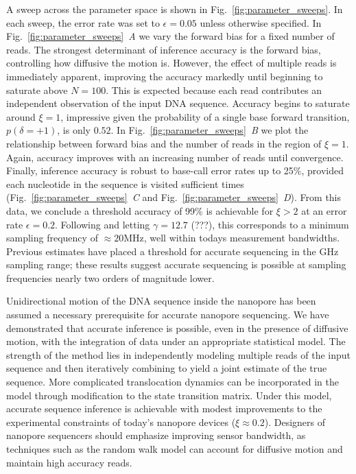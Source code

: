 \documentclass{biophys_letter}
\newcommand{\mhz}{\si{\mega\hertz}}
\newcommand{\kje}[1]{\textcolor{BurntOrange}{#1}}
\begin{document}
A sweep across the parameter space is shown in Fig.~\ref{fig:parameter_sweeps}.
In each sweep, the error rate was set to $\epsilon=0.05$ unless otherwise specified.
In Fig.~\ref{fig:parameter_sweeps}\emph{~A} we vary the forward bias for a fixed number of reads.
The strongest determinant of inference accuracy is the forward bias, controlling how diffusive the motion is.
However, the effect of multiple reads is immediately apparent, improving the accuracy markedly until beginning to saturate above $N=100$.
This is expected because each read contributes an independent observation of the input DNA sequence.
Accuracy begins to saturate around $\xi=1$, impressive given the probability of a single base forward transition, $p(\delta=+1)$, is only $0.52$.
In Fig.~\ref{fig:parameter_sweeps}\emph{~B} we plot the relationship between forward bias and the number of reads in the region of $\xi=1$.
Again, accuracy improves with an increasing number of reads until convergence.
Finally, inference accuracy is \kje{robust to base-call error rates up to 25\%}, provided each nucleotide in the sequence is visited sufficient times (Fig.~\ref{fig:parameter_sweeps}\emph{~C} and Fig.~\ref{fig:parameter_sweeps}\emph{~D}).
\kje{From this data, we conclude a threshold accuracy of 99\% is achievable for $\xi>2$ at an error rate $\epsilon=0.2$.
Following \cite{Larkin:2013} and letting $\gamma=12.7$ (???), this corresponds to a minimum sampling frequency of $\approx20\mhz$, well within todays measurement bandwidths.
Previous estimates have placed a threshold for accurate sequencing in the GHz sampling range; these results suggest accurate sequencing is possible at sampling frequencies nearly two orders of magnitude lower.}

Unidirectional motion of the DNA sequence inside the nanopore has been assumed a necessary prerequisite for accurate nanopore sequencing.
We have demonstrated that accurate inference is possible, even in the presence of diffusive motion, with the integration of data under an appropriate statistical model.
The strength of the method lies in independently modeling multiple reads of the input sequence and then iteratively combining to yield a joint estimate of the true sequence.
More complicated translocation dynamics can be incorporated in the model through modification to the state transition matrix.
\kje{Under this model, accurate sequence inference is achievable with modest improvements to the experimental constraints of today's nanopore devices ($\xi\approx 0.2$).
Designers of nanopore sequencers should emphasize improving sensor bandwidth, as techniques such as the random walk model can account for diffusive motion and maintain high accuracy reads.}
\end{document}
